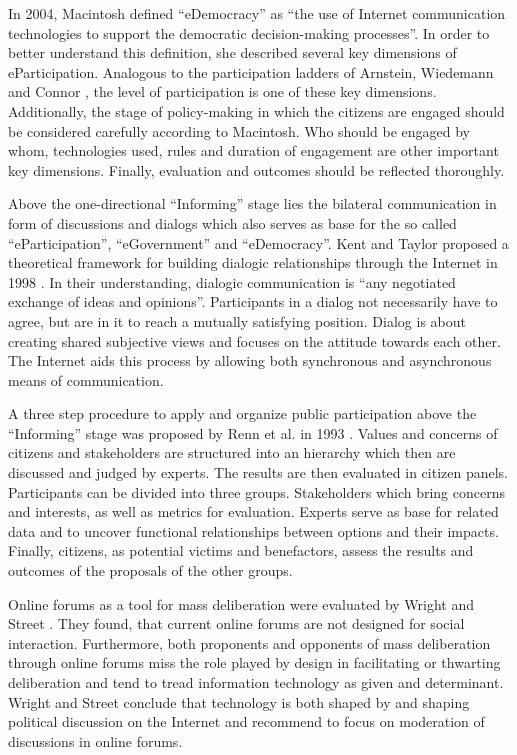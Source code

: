 In 2004, Macintosh \cite{Macintosh2004_eParticipation_characterization} defined ``eDemocracy'' as ``the use of Internet communication technologies to support the democratic decision-making processes''. In order to better understand this definition, she described several key dimensions of eParticipation. Analogous to the participation ladders of Arnstein, Wiedemann and Connor \cite{Arnstein1969_citizen_participation,Wiedemann1993355,Connor1988_new_ladder}, the level of participation is one of these key dimensions. Additionally, the stage of policy-making in which the citizens are engaged should be considered carefully according to Macintosh. Who should be engaged by whom, technologies used, rules and duration of engagement are other important key dimensions. Finally, evaluation and outcomes should be reflected thoroughly.

Above the one-directional ``Informing'' stage lies the bilateral communication in form of discussions and dialogs which also serves as base for the so called ``eParticipation'', ``eGovernment'' and ``eDemocracy''. Kent and Taylor proposed a theoretical framework for building dialogic relationships through the Internet in 1998 \cite{Kent1998_dialogic_relationships_through_www}. In their understanding, dialogic communication is ``any negotiated exchange of ideas and opinions''. Participants in a dialog not necessarily have to agree, but are in it to reach a mutually satisfying position. Dialog is about creating shared subjective views and focuses on the attitude towards each other. The Internet aids this process by allowing both synchronous and asynchronous means of communication.

A three step procedure to apply and organize public participation above the ``Informing'' stage was proposed by Renn et al. in 1993 \cite{Renn1993_participation}. Values and concerns of citizens and stakeholders are structured into an hierarchy which then are discussed and judged by experts. The results are then evaluated in citizen panels. Participants can be divided into three groups. Stakeholders which bring concerns and interests, as well as metrics for evaluation. Experts serve as base for related data and to uncover functional relationships between options and their impacts. Finally, citizens, as potential victims and benefactors, assess the results and outcomes of the proposals of the other groups.

Online forums as a tool for mass deliberation were evaluated by Wright and Street \cite{Wright2007_deliberation_design}. They found, that current online forums are not designed for social interaction. Furthermore, both proponents and opponents of mass deliberation through online forums miss the role played by design in facilitating or thwarting deliberation and tend to tread information technology as given and determinant. Wright and Street conclude that technology is both shaped by and shaping political discussion on the Internet and recommend to focus on moderation of discussions in online forums.

